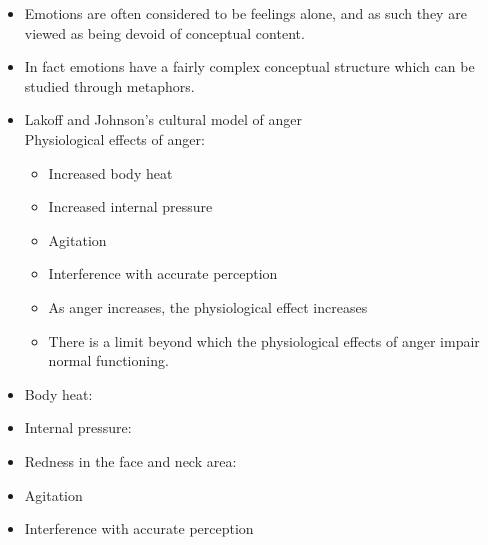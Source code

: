 \documentclass[headrule,footrule]{foils}
\begin{document}
\begin{itemize}\addtolength{\itemsep}{-1ex}
\item Emotions are often considered to be feelings alone, and
as such they are viewed as being devoid of conceptual
content.
\item In fact emotions have a fairly complex conceptual
structure which can be studied through metaphors.
\item Lakoff and Johnson's cultural model of anger
\\ Physiological effects of anger:
  \begin{itemize}
  \item Increased body heat
  \item Increased internal pressure
  \item Agitation
  \item Interference with accurate perception
  \item As anger increases, the physiological effect increases
  \item There is a limit beyond which the physiological effects of anger impair normal functioning.
\end{itemize}
\end{itemize}
\newpage
\begin{itemize}
\item Body heat:
  \begin{exe}
    \ex {}
    \ex {}
    \ex {}
    \ex {}
  \end{exe}
  \item Internal pressure:
  \begin{exe}
    \ex {}
    \ex {}
    \ex {}
  \end{exe}
\newpage
\item Redness in the face and neck area:
  \begin{exe}
    \ex {}
    \ex {}
    \ex {}
  \end{exe}
\item Agitation
\begin{exe}
  \ex {}
  \ex {}
  \ex {}
  \ex {}
 \ex {}
\end{exe}
\newpage
\item Interference with accurate perception
\begin{exe}
  \ex {}
  \ex {}
  \ex {}
\end{exe}
\end{itemize}
\end{document}
